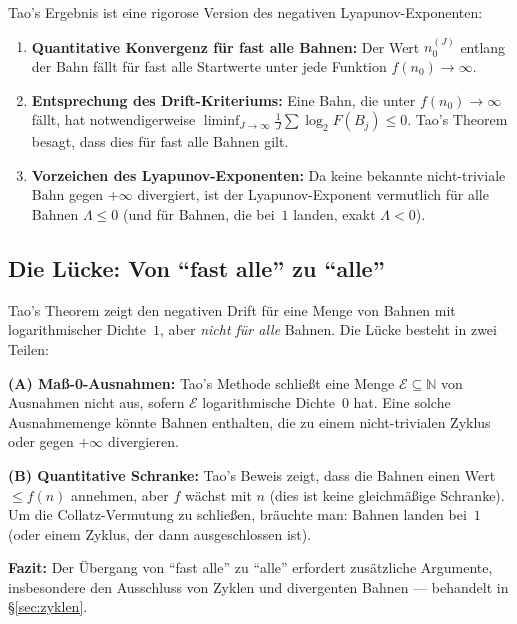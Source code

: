 \documentclass[12pt,a4paper]{article}
\newcommand{\N}{\mathbb{N}}
\newcommand{\logt}{\log_2}        %
\begin{document}
\begin{tcolorbox}[ergebnis, title={Was Tao's Theorem impliziert}]
Tao's Ergebnis ist eine rigorose Version des negativen Lyapunov-Exponenten:
\begin{enumerate}[label=(\arabic*), leftmargin=*]
  \item \textbf{Quantitative Konvergenz für fast alle Bahnen:} Der Wert
    $n_0^{(J)}$ entlang der Bahn fällt für fast alle Startwerte unter jede
    Funktion $f(n_0) \to \infty$.
  \item \textbf{Entsprechung des Drift-Kriteriums:} Eine Bahn, die unter
    $f(n_0) \to \infty$ fällt, hat notwendigerweise
    $\liminf_{J\to\infty}\frac{1}{J}\sum\logt F(B_j) \leq 0$. Tao's Theorem
    besagt, dass dies für fast alle Bahnen gilt.
  \item \textbf{Vorzeichen des Lyapunov-Exponenten:} Da keine bekannte nicht-triviale
    Bahn gegen $+\infty$ divergiert, ist der Lyapunov-Exponent
    vermutlich für alle Bahnen $\Lambda \leq 0$ (und für Bahnen, die bei~$1$
    landen, exakt $\Lambda < 0$).
\end{enumerate}
\end{tcolorbox}

\subsection{Die Lücke: Von ``fast alle'' zu ``alle''}

\begin{tcolorbox}[lücke, title={Präzise Lücke zwischen Tao und dem Ziel}]
Tao's Theorem zeigt den negativen Drift für eine Menge von Bahnen mit
logarithmischer Dichte~$1$, aber \emph{nicht für alle} Bahnen. Die Lücke
besteht in zwei Teilen:

\medskip
\textbf{(A) Maß-0-Ausnahmen:} Tao's Methode schließt eine Menge
$\mathcal{E} \subseteq \N$ von Ausnahmen nicht aus, sofern $\mathcal{E}$
logarithmische Dichte~$0$ hat. Eine solche Ausnahmemenge könnte Bahnen
enthalten, die zu einem nicht-trivialen Zyklus oder gegen $+\infty$
divergieren.

\medskip
\textbf{(B) Quantitative Schranke:} Tao's Beweis zeigt, dass die Bahnen
einen Wert $\leq f(n)$ annehmen, aber $f$ wächst mit $n$ (dies ist keine
gleichmäßige Schranke). Um die Collatz-Vermutung zu schließen, bräuchte
man: Bahnen landen bei~$1$ (oder einem Zyklus, der dann ausgeschlossen ist).

\medskip
\textbf{Fazit:} Der Übergang von ``fast alle'' zu ``alle'' erfordert
zusätzliche Argumente, insbesondere den Ausschluss von Zyklen und divergenten
Bahnen --- behandelt in §\ref{sec:zyklen}.
\end{tcolorbox}
\end{document}
